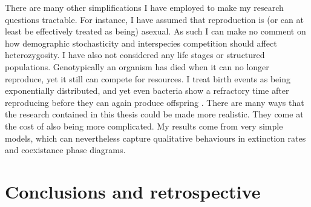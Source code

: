 There are many other simplifications I have employed to make my research questions tractable. 
For instance, I have assumed that reproduction is (or can at least be effectively treated as being) asexual. 
As such I can make no comment on how demographic stochasticity and interspecies competition should affect heterozygosity. 
I have also not considered any life stages or structured populations. 
Genotypically an organism has died when it can no longer reproduce, yet it still can compete for resources. 
I treat birth events as being exponentially distributed, and yet even bacteria show a refractory time after reproducing before they can again produce offspring \cite{Altan-Bonnet???}. 
There are many ways that the research contained in this thesis could be made more realistic. 
They come at the cost of also being more complicated. 
My results come from very simple models, which can nevertheless capture qualitative behaviours in extinction rates and coexistance phase diagrams. 



\section{Conclusions and retrospective}

